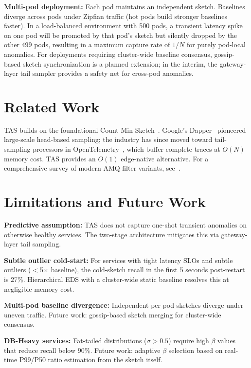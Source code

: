 \documentclass[sigconf,nonacm]{acmart}
\begin{document}
\textbf{Multi-pod deployment:} Each pod maintains an independent sketch. Baselines
diverge across pods under Zipfian traffic (hot pods build stronger baselines faster).
In a load-balanced environment with 500 pods, a transient latency spike on one pod
will be promoted by that pod's sketch but silently dropped by the other 499 pods,
resulting in a maximum capture rate of $1/N$ for purely pod-local anomalies. For
deployments requiring cluster-wide baseline consensus, gossip-based sketch
synchronization is a planned extension; in the interim, the gateway-layer tail sampler
provides a safety net for cross-pod anomalies.

\section{Related Work}

TAS builds on the foundational Count-Min Sketch~\cite{cormode2005}. Google's
Dapper~\cite{sigelman2010} pioneered large-scale head-based sampling; the industry has
since moved toward tail-sampling processors in OpenTelemetry~\cite{otel2023}, which
buffer complete traces at $O(N)$ memory cost. TAS provides an $O(1)$ edge-native
alternative. For a comprehensive survey of modern AMQ filter variants,
see~\cite{cuckoogpu2025}.

\section{Limitations and Future Work}

\textbf{Predictive assumption:} TAS does not capture one-shot transient anomalies on
otherwise healthy services. The two-stage architecture mitigates this via gateway-layer
tail sampling.

\textbf{Subtle outlier cold-start:} For services with tight latency SLOs and subtle
outliers ($<$5$\times$ baseline), the cold-sketch recall in the first 5 seconds
post-restart is 27\%. Hierarchical EDS with a cluster-wide static baseline resolves
this at negligible memory cost.

\textbf{Multi-pod baseline divergence:} Independent per-pod sketches diverge under
uneven traffic. Future work: gossip-based sketch merging for cluster-wide consensus.

\textbf{DB-Heavy services:} Fat-tailed distributions ($\sigma > 0.5$) require high
$\beta$ values that reduce recall below 90\%. Future work: adaptive $\beta$ selection
based on real-time P99/P50 ratio estimation from the sketch itself.
\end{document}
